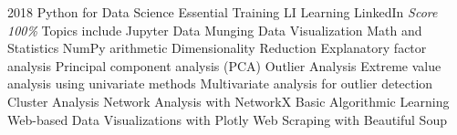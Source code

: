 \documentclass[11pt,a4paper]{moderncv}
\begin{document}
\cventry
    {2018}
    {Python for Data Science Essential Training}
    {LI Learning}
    {LinkedIn}
    {\textit{Score 100\%}}
    {
        Topics include                                                                                            %
            Jupyter                                                                                               %
            Data Munging                                                                                          %
            Data Visualization                                                                                    %
            Math and Statistics                                                                                   %
            NumPy arithmetic                                                                                      %
            Dimensionality Reduction                                                                              %
            Explanatory factor analysis                                                                           %
            Principal component analysis (PCA)                                                                    %
            Outlier Analysis                                                                                      %
            Extreme value analysis using univariate methods                                                       %
            Multivariate analysis for outlier detection                                                           %
            Cluster Analysis                                                                                      %
            Network Analysis with NetworkX                                                                        %
            Basic Algorithmic Learning                                                                            %
            Web-based Data Visualizations with Plotly                                                             %
            Web Scraping with Beautiful Soup                                                                      %
    }
\end{document}
